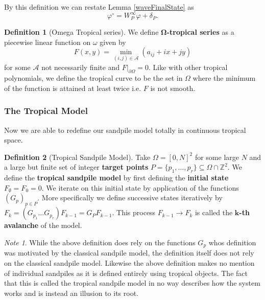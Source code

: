 \documentclass[12pt,a4paper]{amsart}
\newcommand{\Z}{\mathbb{Z}}
\theoremstyle{definition}
\newtheorem{defn}{Definition}[section]
\theoremstyle{remark}
\newtheorem*{note}{Note}
\begin{document}
By this definition we can restate Lemma \ref{waveFinalState} as
\begin{equation}
    \varphi^\circ = W_P^\infty\varphi + \delta_P.
\end{equation}

\begin{defn}[Omega Tropical series]
We define \textbf{$\boldsymbol{\Omega}$-tropical series} as a piecewise linear function on $\omega$ given by
\begin{equation}
    F(x,y) = \min_{(i,j)\in\mathcal{A}}(a_{ij}+ix+jy)
\end{equation}
for some $\mathcal{A}$ not necessarily finite and $F|_{\partial\Omega} = 0$. Like with other tropical polynomials, we define the tropical curve to be the set in $\Omega$ where the minimum of the function is attained at least twice i.e. $F$ is not smooth.

\end{defn}

\subsubsection{The Tropical Model}

Now we are able to redefine our sandpile model totally in continuous tropical space.

\begin{defn}[Tropical Sandpile Model]
Take $\Omega = [0,N]^2$ for some large $N$ and a large but finite set of integer \textbf{target points} $P=\{ p_1,\dots,p_r \}\subseteq\Omega\cap\Z^2$. We define the \textbf{tropical sandpile model} by first defining  the \textbf{initial state} $F_\emptyset = F_0 = 0$. 
We iterate on this initial state by application of the functions $(G_p)_{p\in P}$. More specifically we define successive states iteratively by $F_k = (G_{p_1}\dots G_{p_r})F_{k-1} = G_P F_{k-1}$. This process $F_{k-1}\to F_k$ is called the \textbf{$\boldsymbol{k}$-th avalanche} of the model.
\end{defn}

\begin{note}
While the above definition does rely on the functions $G_p$ whos definition was motivated by the classical sandpile model, the definition itself does not rely on the classical sandpile model.
Likewise the above definition makes no mention of individual sandpiles as it is defined entirely using tropical objects. The fact that this is called the tropical sandpile model in no way describes how the system works and is instead an illusion to its root.
\end{note}
\end{document}
